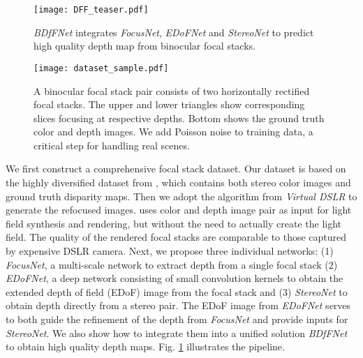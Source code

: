 \documentclass[10pt,twocolumn,letterpaper]{article}
\begin{document}
\begin{figure}[t]
\begin{center}
   \texttt{[image: DFF\_teaser.pdf]}
\end{center}
\vspace{-8pt}
   \caption{\emph{BDfFNet} integrates \emph{FocusNet}, \emph{EDoFNet} and \emph{StereoNet} to predict high quality depth map from binocular focal stacks.}
\label{fig:teaser}
\end{figure}
\begin{figure*}[t]
\begin{center}
   \texttt{[image: dataset\_sample.pdf]}
\end{center}
\vspace{-8pt}
   \caption{A binocular focal stack pair consists of two horizontally rectified focal stacks. The upper and lower triangles show corresponding slices focusing at respective depths. Bottom shows the ground truth color and depth images. We add Poisson noise to training data, a critical step for handling real scenes.}
\label{fig:dataset_sample}
\end{figure*}

We first construct a comprehensive focal stack dataset. Our dataset is based on the highly diversified dataset from \cite{mayer16}, which contains both stereo color images and ground truth disparity maps. Then we adopt the algorithm from \emph{Virtual DSLR} \cite{yang16} to generate the refocused images. \cite{yang16} uses color and depth image pair as input for light field synthesis and rendering, but without the need to actually create the light field. The quality of the rendered focal stacks are comparable to those captured by expensive DSLR camera. Next, we propose three individual networks: (1) \emph{FocusNet}, a multi-scale network to extract depth from a single focal stack (2) \emph{EDoFNet}, a deep network consisting of small convolution kernels to obtain the extended depth of field (EDoF) image from the focal stack and (3) \emph{StereoNet} to obtain depth directly from a stereo pair. The EDoF image from \emph{EDoFNet} serves to both guide the refinement of the depth from \emph{FocusNet} and provide inputs for \emph{StereoNet}. We also show how to integrate them into a unified solution \emph{BDfFNet} to obtain high quality depth maps. Fig. \ref{fig:teaser} illustrates the pipeline.

\end{document}
